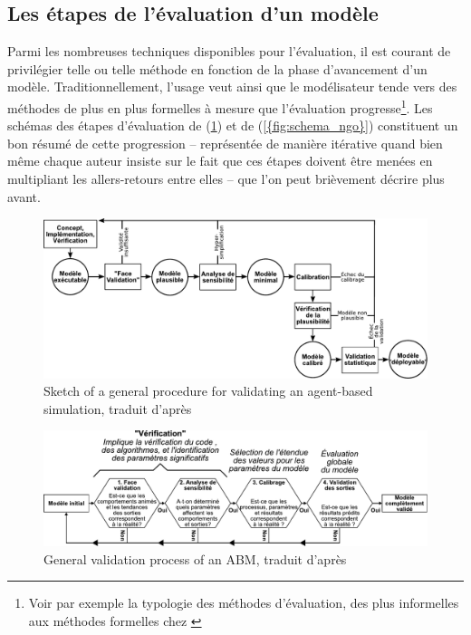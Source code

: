 \clearpage

\subsection{Les étapes de l'évaluation d'un modèle}

Parmi les nombreuses techniques disponibles pour l'évaluation, il est courant de privilégier telle ou telle méthode en fonction de la phase d'avancement d'un modèle.
Traditionnellement, l'usage veut ainsi que le modélisateur tende vers des méthodes de plus en plus formelles à mesure que l'évaluation progresse\footnote{
	Voir par exemple la typologie des méthodes d'évaluation, des plus \og informelles \fg{} aux méthodes \og formelles \fg{} chez \textcite[figure 3, p. 131]{balci_validation_1994}}.
Les schémas des étapes d'évaluation de \citeauthor{klugl_validation_2008} (\cref{fig:schema_kluegl}) et de \citeauthor{ngo_calibration_2012} (\cref{{fig:schema_ngo}}) constituent un bon résumé de cette progression -- représentée de manière itérative quand bien même chaque auteur insiste sur le fait que ces étapes doivent être menées en multipliant les allers-retours entre elles -- que l'on peut brièvement décrire plus avant.

\begin{figure}[H]
	\center
	\includegraphics[width=\linewidth]{img/schema_kluegl_traduit.pdf}
	\caption{\og Sketch of a general procedure for validating an agent-based simulation\fg{}, traduit d'après \textcite[fig. 1 p. 42]{klugl_validation_2008}}
	\label{fig:schema_kluegl}
\end{figure}
\bigskip
\begin{figure}[H]
	\center
	\includegraphics[width=\linewidth]{img/schema_ngo.pdf}
	\caption{\og General validation process of an ABM\fg{}, traduit d'après \textcite[fig. 10.1 p. 183]{ngo_calibration_2012}}
	\label{fig:schema_ngo}
\end{figure}


